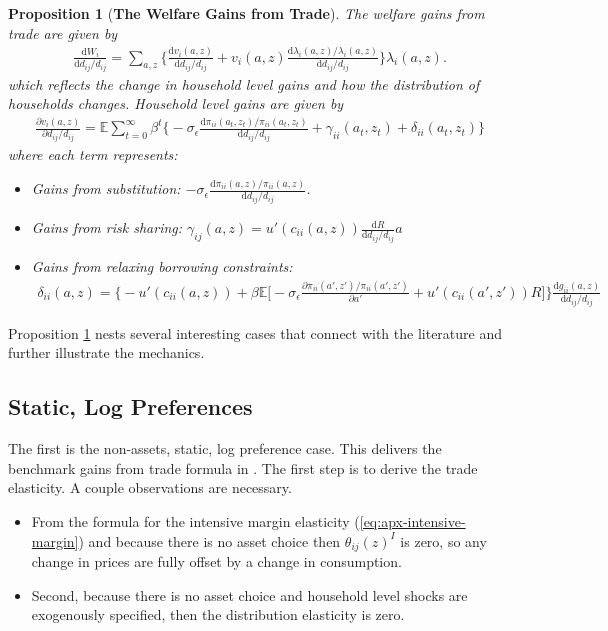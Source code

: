 \documentclass[12pt,pdftex]{article}
\newtheorem{prp}{Proposition}
\begin{document}
\begin{onehalfspacing}
\begin{prp}[\textbf{The Welfare Gains from Trade}] \label{apx-prp:gains-trade} The welfare gains from trade are given by
{\footnotesize
\begin{align}
\frac{\mathrm{d} W_{i}}{\mathrm{d} d_{ij} / d_{ij}} = \sum_{a,z} \bigg \{ \frac{\mathrm{d} v_i(a, z)}{\mathrm{d} d_{ij} / d_{ij}}  + v_{i}(a,z) \frac{\mathrm{d} \lambda_{i}(a,z)/ \lambda_{i}(a,z)}{\mathrm{d} d_{ij} / d_{ij}}  \bigg \} \lambda_{i}(a,z).
\nonumber
\end{align}
}which reflects the change in household level gains and how the distribution of households changes. Household level gains are given by
{\footnotesize
\begin{align}
\nonumber
\frac{\partial v_i(a, z)}{\partial d_{ij} / d_{ij}} = \mathbb{E} \sum_{t = 0}^{\infty} \beta^{t} \bigg \{ -\sigma_{\epsilon} \frac{\mathrm{d} \pi_{ii}(a_{t},z_{t}) / \pi_{ii}(a_{t},z_{t})}{\mathrm{d}d_{ij} / d_{ij}} + \gamma_{ii}(a_{t},z_{t}) + \delta_{ii}(a_{t},z_{t}) \bigg \}
\end{align}
}where each term represents:
\begin{itemize}
\item Gains from substitution: $-\sigma_{\epsilon} \frac{\mathrm{d} \pi_{ii}(a,z) / \pi_{ii}(a,z)}{\mathrm{d}d_{ij} / d_{ij}}$.

\item Gains from risk sharing: $\gamma_{ij}(a,z) = u'(c_{ii}(a,z))\frac{\mathrm{d} R}{\mathrm{d} d_{ij} / d_{ij}}a$

\item Gains from relaxing borrowing constraints:
\begin{align}
\nonumber
\delta_{ii}(a,z) = \bigg \{- u'(c_{ii}(a,z)) + \beta \mathbb{E} \big [-\sigma_{\epsilon} \frac{\partial \pi_{ii}(a',z') / \pi_{ii}(a',z')}{\partial a'} + u'(c_{ii}(a',z'))R \big ] \bigg \}\frac{\mathrm{d} g_{ii}(a,z)}{\mathrm{d} d_{ij} / d_{ij}}
\end{align}
\end{itemize}
\end{prp}
Proposition \ref{apx-prp:gains-trade} nests several interesting cases that connect with the literature and further illustrate the mechanics.

\subsection{Static, Log Preferences}

The first is the non-assets, static, log preference case. This delivers the benchmark gains from trade formula in \citet{arkolakis2012new}. The first step is to derive the trade elasticity. A couple observations are necessary.
\begin{itemize}
\item From the formula for the intensive margin elasticity (\ref{eq:apx-intensive-margin}) and because there is no asset choice then $\theta_{ij}(z)^I$ is zero, so any change in prices are fully offset by a change in consumption.
\item Second, because there is no asset choice and household level shocks are exogenously specified, then the distribution elasticity is zero.


\end{itemize}
\end{onehalfspacing}
\end{document}
